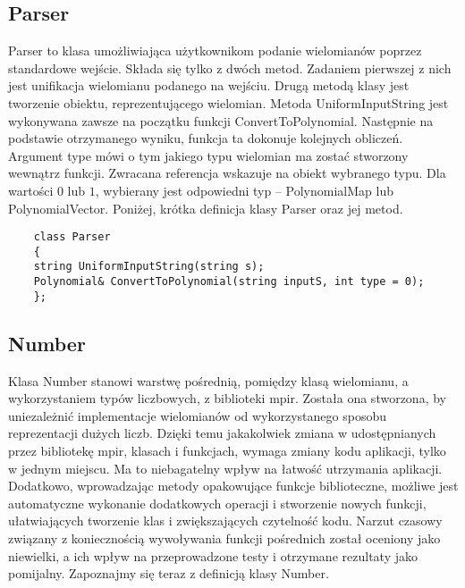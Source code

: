 \documentclass[oneside,a4paper]{book}
\begin{document}
	
	\subsection{Parser}
	Parser to klasa umożliwiająca użytkownikom podanie wielomianów poprzez standardowe wejście. Składa się tylko z dwóch metod. Zadaniem pierwszej z nich jest unifikacja wielomianu podanego na wejściu. Drugą metodą klasy jest tworzenie obiektu, reprezentującego wielomian. Metoda UniformInputString jest wykonywana zawsze na początku funkcji ConvertToPolynomial. Następnie na podstawie otrzymanego wyniku, funkcja ta dokonuje kolejnych obliczeń. Argument type mówi o tym jakiego typu wielomian ma zostać stworzony wewnątrz funkcji. Zwracana referencja wskazuje na obiekt wybranego typu. Dla wartości $0$ lub $1$, wybierany jest odpowiedni typ -- PolynomialMap lub PolynomialVector. Poniżej, krótka definicja klasy Parser oraz jej metod.
	
	\begin{lstlisting}
	class Parser
	{
	string UniformInputString(string s);
	Polynomial& ConvertToPolynomial(string inputS, int type = 0);
	};
	\end{lstlisting}
	
	
	\subsection{Number}
	Klasa Number stanowi warstwę pośrednią, pomiędzy klasą wielomianu, a wykorzystaniem typów liczbowych, z biblioteki mpir. Została ona stworzona, by uniezależnić implementacje wielomianów od wykorzystanego sposobu reprezentacji dużych liczb. Dzięki temu jakakolwiek zmiana w udostępnianych przez bibliotekę mpir, klasach i funkcjach, wymaga zmiany kodu aplikacji, tylko w jednym miejscu. Ma to niebagatelny wpływ na łatwość utrzymania aplikacji. Dodatkowo, wprowadzając metody opakowujące funkcje biblioteczne, możliwe jest automatyczne wykonanie dodatkowych operacji i stworzenie nowych funkcji, ułatwiających tworzenie klas i zwiększających czytelność kodu. Narzut czasowy związany z koniecznością wywoływania funkcji pośrednich został oceniony jako niewielki, a ich wpływ na przeprowadzone testy i otrzymane rezultaty jako pomijalny. Zapoznajmy się teraz z definicją klasy Number.
	
\end{document}
